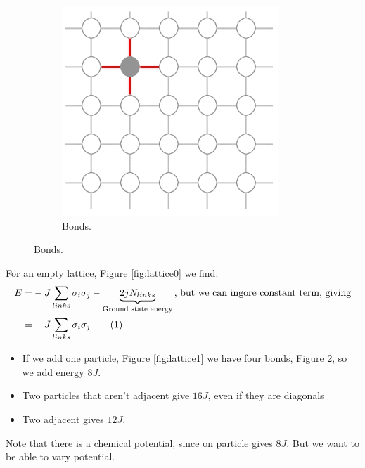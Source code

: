\documentclass[]{article}
\newcommand\numberthis{\addtocounter{equation}{1}\tag{\theequation}}
\begin{document}
\begin{figure}[H]
\begin{subfigure}[b]{0.3\textwidth}
	\end{subfigure}
	\hfill
	\begin{subfigure}[b]{0.3\textwidth}
		\center
		\caption{Bonds.}
		\label{fig:lattice2}
		\includegraphics[width=\textwidth]{lattice2}
	\end{subfigure}
\end{figure}

For an empty lattice, Figure \ref{fig:lattice0} we find:
\begin{align*}
	E =& -J \sum_{links} \sigma_i \sigma_j - \underbrace{2 j N_{links}}_\text{Ground state energy}\text{, but we can ingore constant term, giving}\\
	=& -J \sum_{links} \sigma_i \sigma_j\numberthis \label{eq:empty_lattice}
\end{align*}

\begin{itemize}
	\item If we add one particle, Figure \ref{fig:lattice1} we have four bonds, Figure \ref{fig:lattice2}, so we add energy $8J$.
	\item Two particles that aren't adjacent give $16J$, even if they are diagonals
	\item Two adjacent gives $12J$.
\end{itemize} Note that there is a chemical potential, since on particle gives $8J$. But we want to be able to vary potential.
\end{document}
